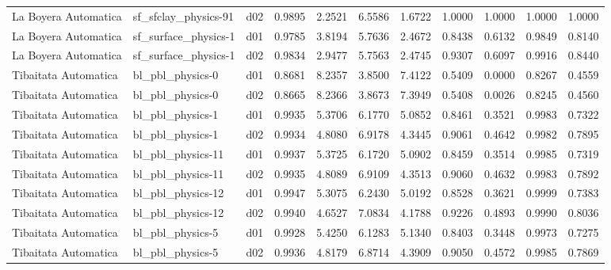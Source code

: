 \begin{longtable}{lllrrrrrrrr}
 La Boyera Automatica  &  sf\_sfclay\_physics-91 &     d02 &   0.9895 &   2.2521 &   6.5586 &       1.6722 &        1.0000 &       1.0000 &           1.0000 &  1.0000 \\
 La Boyera Automatica  &  sf\_surface\_physics-1 &     d01 &   0.9785 &   3.8194 &   5.7636 &       2.4672 &        0.8438 &       0.6132 &           0.9849 &  0.8140 \\
 La Boyera Automatica  &  sf\_surface\_physics-1 &     d02 &   0.9834 &   2.9477 &   5.7563 &       2.4745 &        0.9307 &       0.6097 &           0.9916 &  0.8440 \\
 Tibaitata Automatica  &      bl\_pbl\_physics-0 &     d01 &   0.8681 &   8.2357 &   3.8500 &       7.4122 &        0.5409 &       0.0000 &           0.8267 &  0.4559 \\
 Tibaitata Automatica  &      bl\_pbl\_physics-0 &     d02 &   0.8665 &   8.2366 &   3.8673 &       7.3949 &        0.5408 &       0.0026 &           0.8245 &  0.4560 \\
 Tibaitata Automatica  &      bl\_pbl\_physics-1 &     d01 &   0.9935 &   5.3706 &   6.1770 &       5.0852 &        0.8461 &       0.3521 &           0.9983 &  0.7322 \\
 Tibaitata Automatica  &      bl\_pbl\_physics-1 &     d02 &   0.9934 &   4.8080 &   6.9178 &       4.3445 &        0.9061 &       0.4642 &           0.9982 &  0.7895 \\
 Tibaitata Automatica  &     bl\_pbl\_physics-11 &     d01 &   0.9937 &   5.3725 &   6.1720 &       5.0902 &        0.8459 &       0.3514 &           0.9985 &  0.7319 \\
 Tibaitata Automatica  &     bl\_pbl\_physics-11 &     d02 &   0.9935 &   4.8089 &   6.9109 &       4.3513 &        0.9060 &       0.4632 &           0.9983 &  0.7892 \\
 Tibaitata Automatica  &     bl\_pbl\_physics-12 &     d01 &   0.9947 &   5.3075 &   6.2430 &       5.0192 &        0.8528 &       0.3621 &           0.9999 &  0.7383 \\
 Tibaitata Automatica  &     bl\_pbl\_physics-12 &     d02 &   0.9940 &   4.6527 &   7.0834 &       4.1788 &        0.9226 &       0.4893 &           0.9990 &  0.8036 \\
 Tibaitata Automatica  &      bl\_pbl\_physics-5 &     d01 &   0.9928 &   5.4250 &   6.1283 &       5.1340 &        0.8403 &       0.3448 &           0.9973 &  0.7275 \\
 Tibaitata Automatica  &      bl\_pbl\_physics-5 &     d02 &   0.9936 &   4.8179 &   6.8714 &       4.3909 &        0.9050 &       0.4572 &           0.9985 &  0.7869 \\

\end{longtable}

